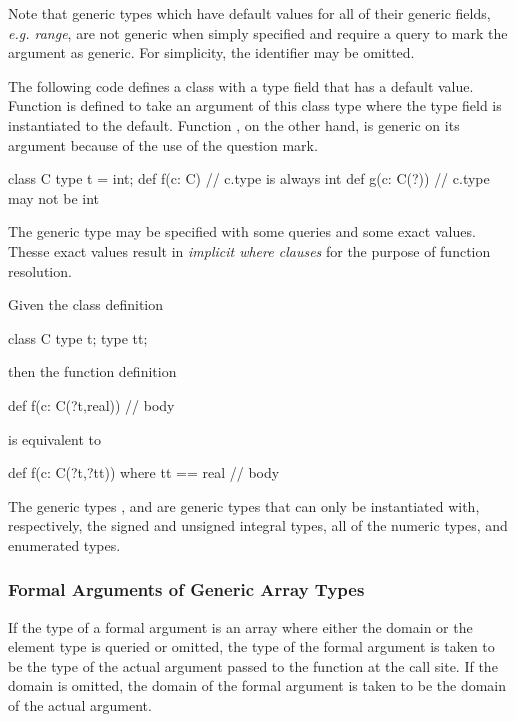 Note that generic types which have default values for all of their
generic fields, \emph{e.g. range}, are not generic when simply
specified and require a query to mark the argument as generic.  For
simplicity, the identifier may be omitted.
\begin{example}
The following code defines a class with a type field that has a
default value.  Function  is defined to take an argument of
this class type where the type field is instantiated to the default.
Function , on the other hand, is generic on its argument
because of the use of the question mark.
\begin{chapel}
class C {
  type t = int;
}
def f(c: C) {
  // c.type is always int
}
def g(c: C(?)) {
  // c.type may not be int
}
\end{chapel}
\end{example}

The generic type may be specified with some queries and some exact
values.  Thesse exact values result in \emph{implicit where clauses}
for the purpose of function resolution.
\begin{example}
Given the class definition
\begin{chapel}
class C {
  type t;
  type tt;
}
\end{chapel}
then the function definition
\begin{chapel}
def f(c: C(?t,real)) {
  // body
}
\end{chapel}
is equivalent to
\begin{chapel}
def f(c: C(?t,?tt)) where tt == real {
  // body
}
\end{chapel}
\end{example}

The generic types ,  and 
are generic types that can only be instantiated with, respectively, the
signed and unsigned integral types, all of the numeric types, and
enumerated types.

\subsubsection{Formal Arguments of Generic Array Types}
\label{Formal_Arguments_of_Generic_Array_Types}

If the type of a formal argument is an array where either the domain
or the element type is queried or omitted, the type of the formal
argument is taken to be the type of the actual argument passed to the
function at the call site.  If the domain is omitted, the domain of
the formal argument is taken to be the domain of the actual argument.

